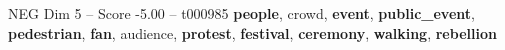\begin{textsample}{NEG Dim 5 – Score -5.00 – t000985}  \label{ex:f5_neg_036}
\textbf{people}, crowd, \textbf{event}, \textbf{public\_event}, \textbf{pedestrian}, \textbf{fan}, audience, \textbf{protest}, \textbf{festival}, \textbf{ceremony}, \textbf{walking}, \textbf{rebellion}

\end{textsample}
